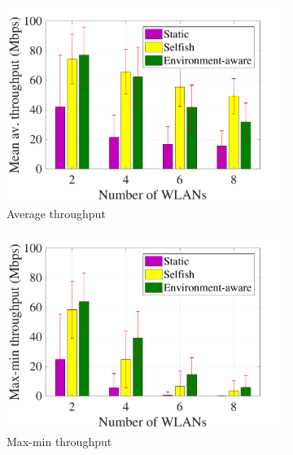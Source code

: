 \documentclass[preprint,12pt]{elsarticle}
\begin{document}
\begin{figure}[h!]
	\centering
	\begin{subfigure}[b]{0.3\textwidth}
		\includegraphics[width=\textwidth]{scalability_mean_tpt}
		\caption{Average throughput}
		\label{fig:scalability_mean_tpt}
	\end{subfigure}
	\begin{subfigure}[b]{0.3\textwidth}
		\includegraphics[width=\textwidth]{scalability_mean_maxmin}
		\caption{Max-min throughput}
		\label{fig:scalability_mean_maxmin}
	\end{subfigure}
	\begin{subfigure}[b]{0.3\textwidth}

\end{subfigure}
\end{figure}
\end{document}
